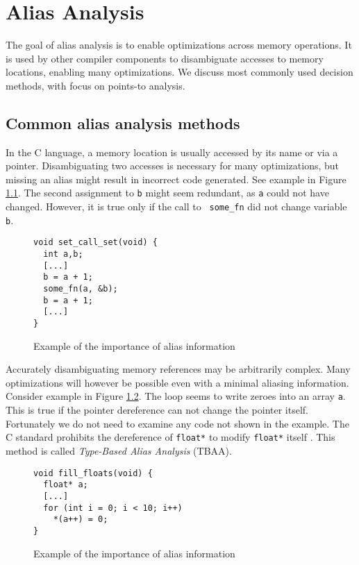 \chapter{Alias Analysis}
\label{chap-aa}

The goal of alias analysis is to enable optimizations across memory operations.
It is used by other compiler components to disambiguate accesses to memory
locations, enabling many optimizations. We discuss most commonly used decision
methods, with focus on points-to analysis.

\section{Common alias analysis methods}

In the C language, a memory location is usually accessed by its name or via a
pointer. Disambiguating two accesses is necessary for many optimizations, but missing an
alias might result in incorrect code generated. See example in Figure
\ref{alias-example1}. The second assignment to {\tt b} might seem redundant, as
{\tt a} could not have changed.  However, it is true only if the call to {\tt
some\_fn} did not change variable {\tt b}.

\begin{figure}[!ht]
\begin{tcolorbox}
\begin{verbatim}
void set_call_set(void) {
  int a,b;
  [...]
  b = a + 1;
  some_fn(a, &b);
  b = a + 1;
  [...]
}
\end{verbatim}
\end{tcolorbox}
\caption{Example of the importance of alias information}
\label{alias-example1}
\end{figure}

Accurately disambiguating memory references may be arbitrarily complex. Many
optimizations will however be possible even with a minimal aliasing information.
Consider example in Figure \ref{alias-example2}. The loop seems to write zeroes
into an array {\tt a}. This is true if the pointer dereference can not
change the pointer itself. Fortunately we do not need to examine any code not
shown in the example. The C standard prohibits the dereference of {\tt float*}
to modify {\tt float*} itself \cite{isoc}. This method is called {\it Type-Based
Alias Analysis} (TBAA).

\begin{figure}[!ht]
\begin{tcolorbox}
\begin{verbatim}
void fill_floats(void) {
  float* a;
  [...]
  for (int i = 0; i < 10; i++)
    *(a++) = 0;
}
\end{verbatim}
\end{tcolorbox}
	\caption{Example of the importance of alias information}
	\label{alias-example2}
\end{figure}

